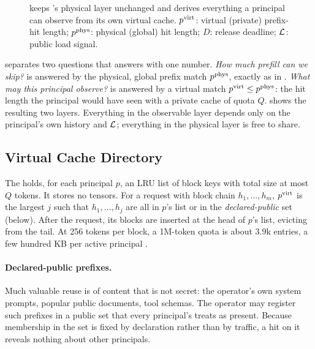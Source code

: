 \begin{figure}[t]
\caption{\sys keeps \mc's physical layer unchanged and derives everything a
principal can observe from its own virtual cache. $p^{\mathrm{virt}}$: virtual (private)
prefix-hit length; $p^{\mathrm{phys}}$: physical (global) hit length; $D$: release deadline;
$\mathcal{L}$: public load signal.}
\label{fig:arch}
\end{figure}

\sys separates two questions that \mc answers with one number. \emph{How much
prefill can we skip?} is answered by the physical, global prefix match $p^{\mathrm{phys}}$,
exactly as in \mc. \emph{What may this principal observe?} is answered by a
virtual match $p^{\mathrm{virt}} \le p^{\mathrm{phys}}$: the hit length the principal would have seen with a
private cache of quota $Q$.  shows the resulting two layers.
Everything in the observable layer depends only on the principal's own history
and $\mathcal{L}$; everything in the physical layer is free to share.

\subsection{Virtual Cache Directory}
\label{sec:vcd}
The \vcd holds, for each principal $p$, an LRU list of block keys with total
size at most $Q$ tokens. It stores no tensors. For a request with block chain
$h_1,\dots,h_m$, $p^{\mathrm{virt}}$ is the largest $j$ such that $h_1,\dots,h_j$ are all in
$p$'s list or in the \emph{declared-public} set (below). After the request, its
blocks are inserted at the head of $p$'s list, evicting from the tail. At 256
tokens per block, a 1M-token quota is about 3.9k entries, a few hundred KB per
active principal .

\paragraph{Declared-public prefixes.} Much valuable reuse is of content that is
not secret: the operator's own system prompts, popular public documents,
tool schemas. The operator may register such prefixes in a public set that every
principal's \vcd treats as present. Because membership in the set is fixed by
declaration rather than by traffic, a hit on it reveals nothing about other
principals. 

